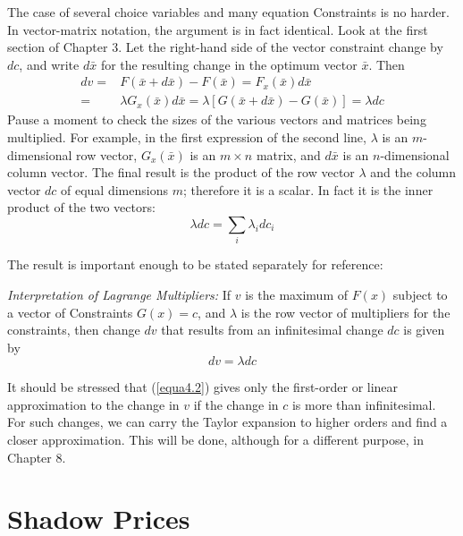 The case of several choice variables and many equation Constraints is no harder. In vector-matrix notation, the argument is in fact identical. Look at the first section of Chapter 3. Let the right-hand side of the vector constraint change by $dc$, and write $d\bar{x}$ for the resulting change in the optimum vector $\bar{x}$. Then
\begin{equation*}
\begin{array}{rl}
dv = & F(\bar{x} + d\bar{x} ) - F(\bar{x}) = F_x(\bar{x}) d\bar{x}  \\
   = & \lambda G_x(\bar{x}) d\bar{x} = \lambda [ G(\bar{x} + d\bar{x} ) - G(\bar{x}) ] = \lambda dc
\end{array}
\end{equation*}
Pause a moment to check the sizes of the various vectors and matrices being multiplied. For example, in the first expression of the second line, $\lambda$ is an $m$-dimensional row vector, $G_x(\bar{x})$ is an $m \times n$ matrix, and $d\bar{x}$ is an $n$-dimensional column vector. The final result is the product of the row vector $\lambda$ and the column vector $dc$ of equal dimensions $m$; therefore it is a scalar. In fact it is the inner product of the two vectors:
\begin{equation*}
 \lambda dc = \sum_i \lambda_i dc_i
\end{equation*}

The result is important enough to be stated separately for reference:

\textit{Interpretation of Lagrange Multipliers:} If $v$ is the maximum of $F(x)$ subject to a vector of Constraints $G(x)=c$, and $\lambda$ is the row vector of multipliers for the constraints, then change $dv$ that results from an infinitesimal change $dc$ is given by
\begin{equation} \label{equa4.2}
dv = \lambda dc
\end{equation}

It should be stressed that (\ref{equa4.2}) gives only the first-order or linear approximation to the change in $v$ if the change in $c$ is more than infinitesimal. For such changes, we can carry the Taylor expansion to higher orders and find a closer approximation. This will be done, although for a different purpose, in Chapter 8.

\section*{Shadow Prices}


